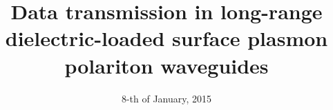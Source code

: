 %
%


\usepackage{graphicx}          %
\usepackage{hyperref}          %
\usepackage{pgf}               %
\usepackage{fancybox}          %
\usepackage{pgfpages}
\usepackage{amsfonts}          %
\usepackage{pifont}            %
\newcommand{\cmark}{\ding{51}}%
\newcommand{\xmark}{\ding{55}}%

\graphicspath{ {./img/} }



\title[Data transmission in LR-DLSPPW]
      {Data transmission in long-range dielectric-loaded surface plasmon 
      polariton waveguides}

\date[Nanometa-2015]{8-th of January, 2015}


